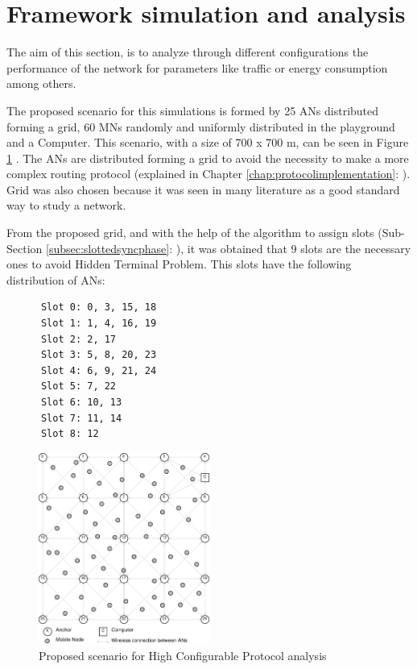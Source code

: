 \section{Framework simulation and analysis}

The aim of this section, is to analyze through different configurations the performance of the network for parameters like traffic or energy 
consumption among others.

The proposed scenario for this simulations is formed by 25 \acp{AN} distributed forming a grid, 60 \acp{MN} randomly and uniformly distributed in the
playground and a Computer. This scenario, with a size of 700 x 700 m, can be seen in Figure \ref{fig:finalscenario} . The \acp{AN} 
are distributed forming a grid to avoid the necessity to make a more complex routing protocol (explained in Chapter \ref{chap:protocolimplementation}: 
). Grid was also chosen because it was seen in many literature as a good standard way to study a network.

From the proposed grid, and with the help of the algorithm to assign slots (Sub-Section \ref{subsec:slottedsyncphase}: 
), it was obtained that 9 slots are the necessary ones to avoid Hidden Terminal Problem. This slots have the 
following distribution of \acp{AN}:

\begin{verbatim}
      Slot 0: 0, 3, 15, 18
      Slot 1: 1, 4, 16, 19
      Slot 2: 2, 17
      Slot 3: 5, 8, 20, 23
      Slot 4: 6, 9, 21, 24
      Slot 5: 7, 22
      Slot 6: 10, 13
      Slot 7: 11, 14
      Slot 8: 12
\end{verbatim}

\begin{figure}[ht]
 \begin{center}
  \includegraphics[width=0.5\textwidth]{finalscenario.eps}
 \end{center}
 \caption{Proposed scenario for High Configurable Protocol analysis}
 \label{fig:finalscenario}
\end{figure}

